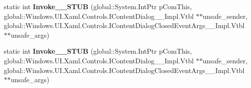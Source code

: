 \begin{DoxyCompactItemize}
\mbox{\label{struct_windows_1_1_foundation_1_1_typed_event_handler___a___windows___u_i___xaml___controls___co7a2cb13f58867dd2ebe18aa3ab56ee61_a9e25cceaa037b4116e15400dedd45cd9}} 
static int {\bfseries Invoke\+\_\+\+\_\+\+S\+T\+UB} (global\+::\+System.\+Int\+Ptr p\+Com\+This, global\+::\+Windows.\+U\+I.\+Xaml.\+Controls.\+I\+Content\+Dialog\+\_\+\+\_\+\+Impl.\+Vtbl $\ast$$\ast$unsafe\+\_\+sender, global\+::\+Windows.\+U\+I.\+Xaml.\+Controls.\+I\+Content\+Dialog\+Closed\+Event\+Args\+\_\+\+\_\+\+Impl.\+Vtbl $\ast$$\ast$unsafe\+\_\+args)
\item 
\mbox{\label{struct_windows_1_1_foundation_1_1_typed_event_handler___a___windows___u_i___xaml___controls___co7a2cb13f58867dd2ebe18aa3ab56ee61_a9e25cceaa037b4116e15400dedd45cd9}} 
static int {\bfseries Invoke\+\_\+\+\_\+\+S\+T\+UB} (global\+::\+System.\+Int\+Ptr p\+Com\+This, global\+::\+Windows.\+U\+I.\+Xaml.\+Controls.\+I\+Content\+Dialog\+\_\+\+\_\+\+Impl.\+Vtbl $\ast$$\ast$unsafe\+\_\+sender, global\+::\+Windows.\+U\+I.\+Xaml.\+Controls.\+I\+Content\+Dialog\+Closed\+Event\+Args\+\_\+\+\_\+\+Impl.\+Vtbl $\ast$$\ast$unsafe\+\_\+args)
\end{DoxyCompactItemize}
